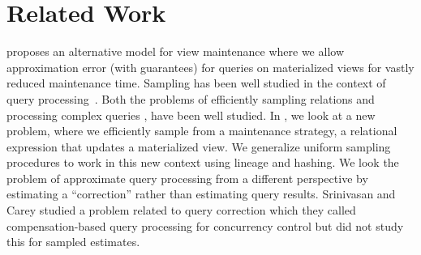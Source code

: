 
\section{Related Work}\label{related}
\vspace{-.3em}

\svc proposes an alternative model for view maintenance where we allow approximation error (with guarantees) for queries on materialized views for vastly reduced maintenance time.
Sampling has been well studied in the context of query processing~\cite{AgarwalMPMMS13, olken1993random, garofalakis2001approximate}. 
Both the problems of efficiently sampling relations \cite{olken1993random} and processing complex queries \cite{agarwalknowing}, have been well studied. 
In \svc, we look at a new problem, where we efficiently sample from a maintenance strategy, a relational expression that updates a materialized view.
We generalize uniform sampling procedures to work in this new context using lineage \cite{DBLP:journals/vldb/CuiW03} and hashing.
We look the problem of approximate query processing \cite{AgarwalMPMMS13, agarwalknowing} from a different perspective by estimating a ``correction'' rather than estimating query results. 
Srinivasan and Carey studied a problem related to query correction which they called compensation-based query processing \cite{srinivasanC92} for concurrency control but did not study this for sampled estimates.

